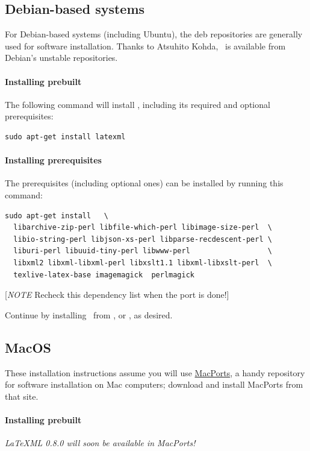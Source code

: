 \documentclass{article}
\begin{document}
\subsection{Debian-based systems}\label{install.deb}
For Debian-based systems (including Ubuntu), the deb repositories
are generally used for software installation.
Thanks to Atsuhito Kohda, \LaTeXML\ is available from Debian's
unstable repositories.

\paragraph{Installing prebuilt}
The following command will install \LaTeXML, including its required
and optional prerequisites:
\begin{lstlisting}[style=shell]
sudo apt-get install latexml
\end{lstlisting}

\paragraph{Installing prerequisites}\label{install.deb.prereq}
The prerequisites (including optional ones) can be installed
by running this command: 
\begin{lstlisting}[style=shell]
sudo apt-get install   \
  libarchive-zip-perl libfile-which-perl libimage-size-perl  \
  libio-string-perl libjson-xs-perl libparse-recdescent-perl \
  liburi-perl libuuid-tiny-perl libwww-perl                  \
  libxml2 libxml-libxml-perl libxslt1.1 libxml-libxslt-perl  \
  texlive-latex-base imagemagick  perlmagick
\end{lstlisting}
[\emph{NOTE} Recheck this dependency list when the port is done!]

Continue by installing \LaTeXML\ from
\htmlref{tarball}{install.tarball}, 
or , as desired.

\subsection{MacOS}\label{install.mac}
These installation instructions assume you will use \href{http://www.macports.org}{MacPorts},
a handy repository for software installation on Mac computers;
download and install MacPorts from that site.

\paragraph{Installing prebuilt}
\emph{LaTeXML 0.8.0 will soon be available in MacPorts!}
\end{document}
